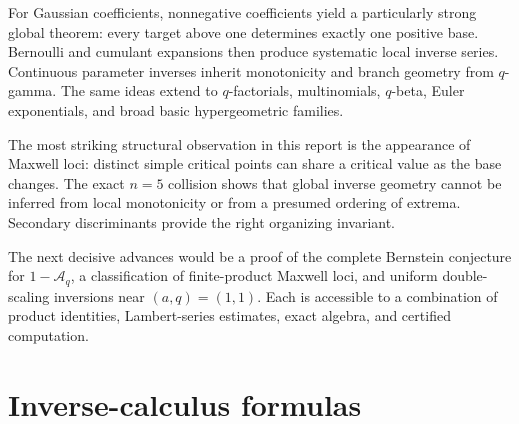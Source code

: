\documentclass[11pt,oneside]{article}
\theoremstyle{definition}
\theoremstyle{remark}
\theoremstyle{plain}
\theoremstyle{definition}
\theoremstyle{remark}
\newcommand{\Aq}{\mathcal A_q}
\numberwithin{equation}{section}
\numberwithin{figure}{section}
\numberwithin{table}{section}
\let\reporttopsection\section
\let\reportsubsection\subsection
\let\reportsubsubsection\subsubsection
\let\chapter\reporttopsection
\let\section\reportsubsection
\let\subsection\reportsubsubsection
\begin{document}
For Gaussian coefficients, nonnegative coefficients yield a particularly
strong global theorem: every target above one determines exactly one positive
base.  Bernoulli and cumulant expansions then produce systematic local inverse
series.  Continuous parameter inverses inherit monotonicity and branch geometry
from \(q\)-gamma.  The same ideas extend to \(q\)-factorials, multinomials,
\(q\)-beta, Euler exponentials, and broad basic hypergeometric families.

The most striking structural observation in this report is the appearance of Maxwell
loci: distinct simple critical points can share a critical value as the base
changes.  The exact \(n=5\) collision shows that global inverse geometry cannot
be inferred from local monotonicity or from a presumed ordering of extrema.
Secondary discriminants provide the right organizing invariant.

The next decisive advances would be a proof of the complete Bernstein
conjecture for \(1-\Aq\), a classification of finite-product Maxwell loci, and
uniform double-scaling inversions near \((a,q)=(1,1)\).  Each is accessible to a
combination of product identities, Lambert-series estimates, exact algebra, and
certified computation.

\appendix
\renewcommand*{\theHsection}{appendix.\Alph{section}}
\renewcommand*{\theHsubsection}{\theHsection.\arabic{subsection}}
\renewcommand*{\theHsubsubsection}{\theHsubsection.\arabic{subsubsection}}
\renewcommand*{\theHtheorem}{\theHsection.\arabic{theorem}}
\renewcommand*{\theHequation}{\theHsection.\arabic{equation}}
\renewcommand*{\theHfigure}{\theHsection.\arabic{figure}}
\renewcommand*{\theHtable}{\theHsection.\arabic{table}}

\chapter{Inverse-calculus formulas}
\label{app:inverse-calculus}
\end{document}
